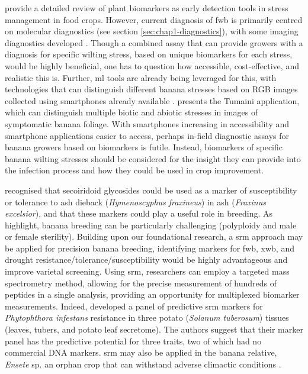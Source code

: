 \textcite{Aina2024} provide a detailed review of plant biomarkers as early detection tools in stress management in food crops. However, current diagnosis of \ac{fwb} is primarily centred on molecular diagnostics (see section \ref{sec:chap1-diagnostics}), with some imaging diagnostics developed \parencite{Ye2020a, Ye2020b, Selvaraj2019b, Zhang2022}. Though a combined assay that can provide growers with a diagnosis for specific wilting stress, based on unique biomarkers for each stress, would be highly beneficial, one has to question how accessible, cost-effective, and realistic this is. Further, \ac{ml} tools are already being leveraged for this, with technologies that can distinguish different banana stresses based on RGB images collected using smartphones already available \parencite{Aasha2024}. \textcite{Selvaraj2019b} presents the Tumaini application, which can distinguish multiple biotic and abiotic stresses in images of symptomatic banana foliage. With smartphones increasing in accessibility and smartphone applications easier to access, perhaps in-field diagnostic assays for banana growers based on biomarkers is futile. Instead, biomarkers of specific banana wilting stresses should be considered for the insight they can provide into the infection process and how they could be used in crop improvement. 

\textcite{Sambles2017, Sidda2020} recognised that secoiridoid glycosides could be used as a marker of susceptibility or tolerance to ash dieback (\textit{Hymenoscyphus fraxineus}) in ash (\textit{Fraxinus excelsior}), and that these markers could play a useful role in breeding. As \textcite{Nansamba2020} highlight, banana breeding can be particularly challenging (polyploidy and male or female sterility). Building upon our foundational research, a \ac{srm} approach may be applied for precision banana breeding, identifying markers for \ac{fwb}, \ac{xwb}, and drought resistance/tolerance/susceptibility would be highly advantageous and improve varietal screening. Using \ac{srm}, researchers can employ a targeted mass spectrometry method, allowing for the precise measurement of hundreds of peptides in a single analysis, providing an opportunity for multiplexed biomarker measurements. Indeed, \textcite{Chawade2016} developed a panel of predictive \ac{srm} markers for \textit{Phytophthora infestans} resistance in three potato (\textit{Solanum tuberosum}) tissues (leaves, tubers, and potato leaf secretome). The authors suggest that their marker panel has the predictive potential for three traits, two of which had no commercial DNA markers. \Ac{srm} may also be applied in the banana relative, \textit{Ensete} sp. an orphan crop that can withstand adverse climactic conditions \parencite{Feyisa2022}.

